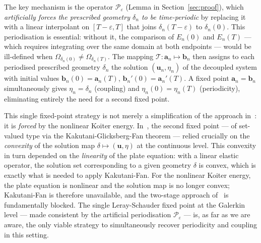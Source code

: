\documentclass[10pt,a4paper]{article}
\numberwithin{equation}{section}
\begin{document}
The key mechanism is the operator $\mathcal{P}_\varepsilon$
(Lemma in Section~\ref{sec:proof}), which \emph{artificially forces the prescribed
geometry $\delta_n$ to be time-periodic} by replacing it with a linear interpolant
on $[T-\varepsilon, T]$ that joins $\delta_n(T-\varepsilon)$ to $\delta_n(0)$.
This periodisation is essential: without it, the comparison of $E_n(0)$ and
$E_n(T)$ — which requires integrating over the same domain at both endpoints
— would be ill-defined when $\Omega_{\delta_n(0)} \ne \Omega_{\delta_n(T)}$.
The mapping $\mathcal{T}\colon \mathbf{a}_n \mapsto \mathbf{b}_n$ then assigns
to each periodised prescribed geometry $\delta_n$ the solution $(\mathbf{u}_n,\eta_n)$
of the decoupled system with initial values $\mathbf{b}_n(0) = \mathbf{a}_n(T)$,
$\mathbf{b}_n'(0) = \mathbf{a}_n'(T)$. A fixed point $\mathbf{a}_n = \mathbf{b}_n$
simultaneously gives $\eta_n = \delta_n$ (coupling) and $\eta_n(0) = \eta_n(T)$
(periodicity), eliminating entirely the need for a second fixed point.

This single fixed-point strategy is not merely a simplification of the approach
in~\cite{Claudiu22}: it is \emph{forced} by the nonlinear Koiter energy.
In~\cite{Claudiu22}, the second fixed point — of set-valued type via the
Kakutani-Glicksberg-Fan theorem — relied crucially on the \emph{convexity} of
the solution map $\delta \mapsto (\mathbf{u}, \eta)$ at the continuous level.
This convexity in turn depended on the \emph{linearity} of the plate equation:
with a linear elastic operator, the solution set corresponding to a given geometry
$\delta$ is convex, which is exactly what is needed to apply Kakutani-Fan.
For the nonlinear Koiter energy, the plate equation is nonlinear and the solution
map is no longer convex; Kakutani-Fan is therefore unavailable, and the two-stage
approach of~\cite{Claudiu22} is fundamentally blocked. The single Leray-Schauder
fixed point at the Galerkin level — made consistent by the artificial periodisation
$\mathcal{P}_\varepsilon$ — is, as far as we are aware, the only viable strategy
to simultaneously recover periodicity and coupling in this setting.
\end{document}
